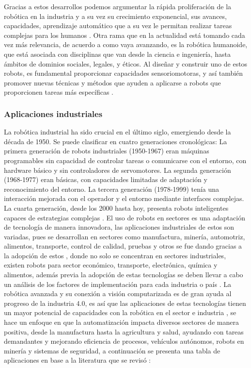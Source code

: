 \documentclass[conference]{IEEEtran}
\begin{document}
Gracias a estos desarrollos podemos argumentar la rápida proliferación de la robótica en la industria y a su vez su crecimiento exponencial, sus avances, capacidades, aprendizaje automático que a su vez le permitan realizar tareas complejas para los humanos \cite{Backer2018}.
Otra rama que en la actualidad está tomando cada vez más relevancia, de acuerdo a como vaya avanzando, es la robótica humanoide, que está asociada con disciplinas que van desde la ciencia e ingeniería, hasta ámbitos de dominios sociales, legales, y éticos. Al diseñar y construir uno de estos robots, es fundamental proporcionar capacidades sensoriomotoras, y así también promover nuevas técnicas y métodos que ayuden a aplicarse a robots que proporcionen tareas más específicas \cite{Fukuda2017}.

\subsubsection{Aplicaciones industriales}
La robótica industrial ha sido crucial en el último siglo, emergiendo desde la década de 1950. Se puede clasificar en cuatro generaciones cronológicas: La primera generación de robots industriales (1950-1967) eran máquinas programables sin capacidad de controlar tareas o comunicarse con el entorno, con hardware básico y sin controladores de servomotores. La segunda generación (1968-1977) eran básicas, con capacidades limitadas de adaptación y reconocimiento del entorno. La tercera generación (1978-1999) tenía una interacción mejorada con el operador y el entorno mediante interfaces complejas. La cuarta generación, desde los 2000 hasta hoy, presenta robots inteligentes capaces de estrategias complejas \cite{Gasparetto2019}.
El uso de robots en sectores es una adaptación de tecnología de manera innovadora, las aplicaciones industriales de estos son variadas, pues se desarrollan en sectores como manufactura, minería, automotriz, alimentos, transporte, control de calidad, pruebas y otros se fue dando gracias a la adopción de estos \cite{Sherwani2020}, donde no solo se concentran en sectores industriales, existen robots para sector económico, transporte, electrónica, química y alimentos, además previa la adopción de estas tecnologías se deben llevar a cabo un análisis de los factores de implementación para cada industria o país \cite{Backer2018}.
La robótica avanzada y su conexión a visión computarizada es de gran ayuda al progreso de la industria 4.0, es así que las aplicaciones de estas tecnologías tienen un mayor potencial de capacidades con la robótica en el sector e industria \cite{Javaid2021}, se hace un enfoque en que la automatización impacta diversos sectores de manera positiva, desde la manufactura hasta la agricultura y salud, ayudando con tareas demandantes y mejorando eficiencia de procesos, vehículos autónomos, robots en minería y sistemas de seguridad, a continuación se presenta una tabla de aplicaciones en base a la literatura que se revisó \cite{Goel2020}:
\end{document}
